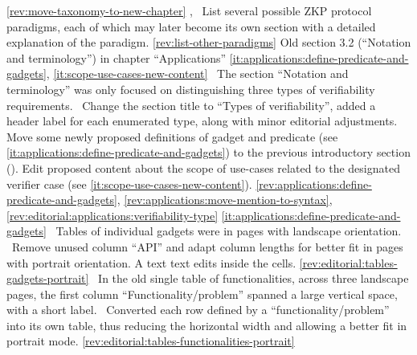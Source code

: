 \newcol \ref{rev:move-taxonomy-to-new-chapter}
\rowendL
\newcol 
\newcol {}, 
\newcol \Chan\ List several possible ZKP protocol paradigms, each of which may later 
	become its own section with a detailed explanation of the paradigm.
\newcol \ref{rev:list-other-paradigms}
\rowendL
Old section 3.2 (``Notation and terminology'') in chapter ``Applications''
\newcol 
\newcol \ref{it:applications:define-predicate-and-gadgets}, \ref{it:scope-use-cases-new-content}
\newcol \Note\ The section ``Notation and terminology'' was only focused on distinguishing three types of verifiability requirements.
				\Chan{}ge the section title to ``Types of verifiability'', added a header label for each enumerated type, along with minor editorial adjustments.
				Move some newly proposed definitions of gadget and predicate (see \ref{it:applications:define-predicate-and-gadgets}) to the previous introductory section ().
				Edit proposed content about the scope of use-cases related to the designated verifier case (see \ref{it:scope-use-cases-new-content}).
\newcol \ref{rev:applications:define-predicate-and-gadgets}, \ref{rev:applications:move-mention-to-syntax}, \ref{rev:editorial:applications:verifiability-type}
\rowendL
\newcol 
\newcol \ref{it:applications:define-predicate-and-gadgets}
\newcol \Note\ Tables of individual gadgets were in pages with landscape orientation.
				\Chan\ Remove unused column ``API'' and adapt column lengths for better fit in pages with portrait orientation. A text text edits inside the cells.
\newcol \ref{rev:editorial:tables-gadgets-portrait}
\rowendL
\newcol 
\newcol 
\newcol \Note\ In the old single table of functionalities, across three landscape pages, the first column ``Functionality/problem'' spanned a large vertical space, with a short label.
				\Chan\ Converted each row defined by a ``functionality/problem'' into its own table, thus reducing the horizontal width and allowing a better fit in portrait mode.
\newcol \ref{rev:editorial:tables-functionalities-portrait}
\rowendL
